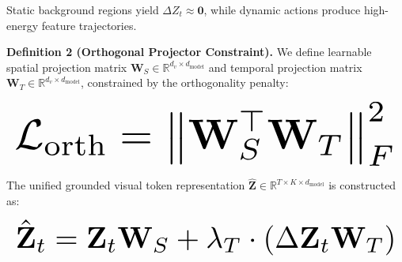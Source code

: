 \documentclass[manuscript,review]{acmart}
\begin{document}
Static background regions yield $\Delta Z_t \approx \mathbf{0}$, while dynamic actions produce high-energy feature trajectories.

\textbf{Definition 2 (Orthogonal Projector Constraint).} We define learnable spatial projection matrix $\mathbf{W}_S \in \mathbb{R}^{d_v \times d_{\text{model}}}$ and temporal projection matrix $\mathbf{W}_T \in \mathbb{R}^{d_v \times d_{\text{model}}}$, constrained by the orthogonality penalty:

















\begin{equation}
\resizebox{\columnwidth}{!}{$\displaystyle
\begin{aligned}
\mathcal{L}_{\text{orth}} = \left\| \mathbf{W}_S^\top \mathbf{W}_T \right\|_F^2
\end{aligned}
$}
\end{equation}

















The unified grounded visual token representation $\hat{\mathbf{Z}} \in \mathbb{R}^{T \times K \times d_{\text{model}}}$ is constructed as:

















\begin{equation}
\resizebox{\columnwidth}{!}{$\displaystyle
\begin{aligned}
\hat{\mathbf{Z}}_t = \mathbf{Z}_t \mathbf{W}_S + \lambda_T \cdot \left( \Delta \mathbf{Z}_t \mathbf{W}_T \right)
\end{aligned}
$}
\end{equation}
\end{document}
